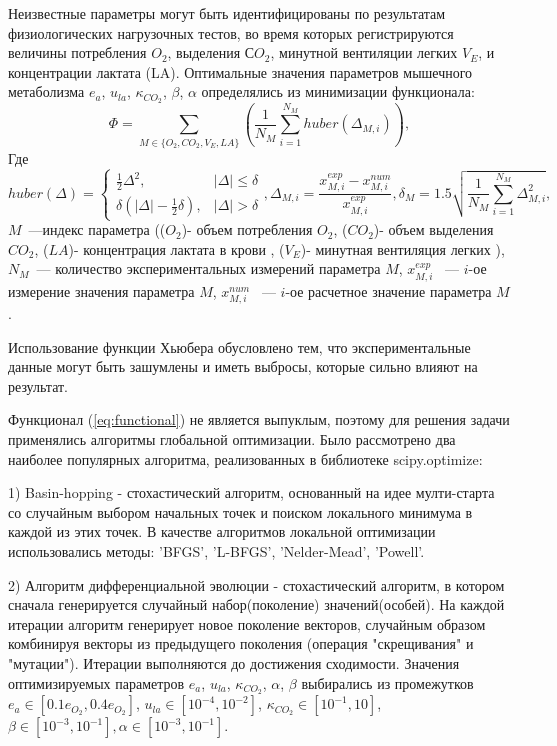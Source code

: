 Неизвестные параметры могут быть идентифицированы по результатам физиологических нагрузочных тестов, во время которых регистрируются величины потребления \(O_{2}\), выделения \(СO_{2}\), минутной вентиляции легких \(V_{E}\), и концентрации лактата (LA). 
Оптимальные значения параметров мышечного метаболизма $e_{a}$, $u_{la}$, $\kappa_{CO_{2}}$, $\beta$, $\alpha$ определялись из минимизации функционала:
\begin{equation} \label{eq:functional}
\Phi = \sum \limits_{M \in \{O_2, CO_2, V_E, LA\}} \left( \frac{1}{N_M}\sum_{i=1}^{N_M} huber\left(\Delta_{M,i}\right) \right),
\end{equation}
\noindent Где
\begin{equation} \label{eq:huber}
huber(\Delta)=\begin{cases}
\frac{1}{2}\Delta^2,& |\Delta| \le \delta\\
\delta(|\Delta|-\frac{1}{2}\delta),& |\Delta| > \delta
\end{cases}, 
\Delta_{M,i}=\frac{x_{M,i}^{exp}-x_{M,i}^{num}}{x_{M,i}^{exp}}, \delta_M = 1.5\sqrt{\frac{1}{N_M}\sum_{i=1}^{N_M}\Delta_{M, i}^{2}},
\end{equation}
\noindent $M$~---индекс параметра (($O_{2}$)- объем потребления $O_{2}$, ($CO_2$)- объем выделения $CO_{2}$, ($LA$)- концентрация лактата в крови , ($V_E$)- минутная вентиляция легких ), $N_M$~--- количество экспериментальных измерений параметра $M$, $x_{M,i}^{exp}$ ~--- $i$-ое измерение значения параметра $M$, $x_{M,i}^{num}$ ~--- $i$-ое расчетное значение параметра $M$.

Использование функции Хьюбера обусловлено тем, что экспериментальные данные могут быть зашумлены и иметь выбросы, которые сильно влияют на результат. 

Функционал (\ref{eq:functional}) не является выпуклым, поэтому для решения задачи применялись алгоритмы глобальной оптимизации. Было рассмотрено два наиболее популярных алгоритма, реализованных в библиотеке scipy.optimize:

1) Basin-hopping \cite{Wales1997}- стохастический алгоритм, основанный на идее мулти-старта со случайным выбором начальных точек и поиском локального минимума в каждой из этих точек. В качестве алгоритмов локальной оптимизации использовались методы: 'BFGS', 'L-BFGS', 'Nelder-Mead', 'Powell'.    

2) Алгоритм дифференциальной эволюции \cite{Storn1997} - стохастический алгоритм, в котором сначала генерируется случайный набор(поколение) значений(особей). На каждой итерации алгоритм генерирует новое поколение векторов, случайным образом комбинируя векторы из предыдущего поколения (операция "скрещивания" и "мутации"). Итерации выполняются до достижения сходимости. Значения оптимизируемых параметров $e_{a}$, $u_{la}$, $\kappa_{CO_{2}}$, $\alpha$, $\beta$ выбирались из промежутков $e_{a}\in [0.1e_{O_{2}}, 0.4e_{O_{2}}]$, 
$u_{la}\in [10^{-4}, 10^{-2}]$, 
$\kappa_{CO_{2}}\in [10^{-1}, 10]$, 
$\beta \in [10^{-3}, 10^{-1}], \alpha\in [10^{-3}, 10^{-1}]$. 

